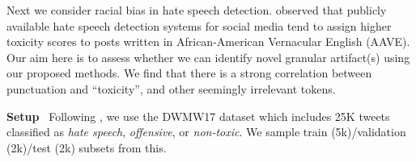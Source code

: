 \documentclass[11pt]{article}
\newcommand\para[1]{\vskip 1mm\noindent\textbf{#1}~}
\begin{document}
Next we consider %
racial bias in hate speech detection. 
 \citet{sap2019risk} observed that publicly available hate speech detection systems for social media tend to assign higher toxicity scores to posts written in African-American Vernacular English (AAVE). 
Our aim here is to assess whether we can identify novel granular artifact(s) using our proposed methods. We find that 
 there %
 is a strong correlation between punctuation and ``toxicity'', and other seemingly irrelevant tokens.%

\para{Setup} Following \citet{sap2019risk}, we use the DWMW17 dataset \citep{davidson2017automated} which includes 25K tweets classified as \emph{hate speech}, \emph{offensive}, or \emph{non-toxic}. 
We sample train (5k)/validation (2k)/test (2k) subsets from this. %
\begin{comment}
We use the topic model from \citealt{blodgett2016demographic} to classify tweets as exhibiting AAVE and WAE (keeping samples with dialect confidence $>$0.8, following \citealt{sap2019risk}). 


To identify AAVE-correlated artifacts that result in models classifying non-toxic AAVE tweets as toxic, we need pairs of tweets that differ in dialect (WAE vs. AAVE) but that are otherwise similar. %
Such paired examples are not available, so we introduce simple word replacement heuristics to convert WAE tweets into AAVE, e.g., swapping the $\rightarrow$ da, with $\rightarrow$ wit, and inserting words (e.g., ``yo'').
For example, we modify ``\textit{the spear chuckers aren't flooding into Upton Park.}'' to ``\textit{da spear chuckers ain't floodin into Upton Park. yo yo yo!}''. 
We provide all heuristics and their effect on our topic model dialect classifier in Section \ref{ap:st} of the Appendix. 
Applying these heuristics to non-toxic WAE tweets in the test set results in the model flipping its prediction from non-toxic to toxic for 14.2\% of instances.
We would like to use attribution methods to detect when the model (wrongly) exploits these shallow correlations.
\end{comment}
\end{document}
